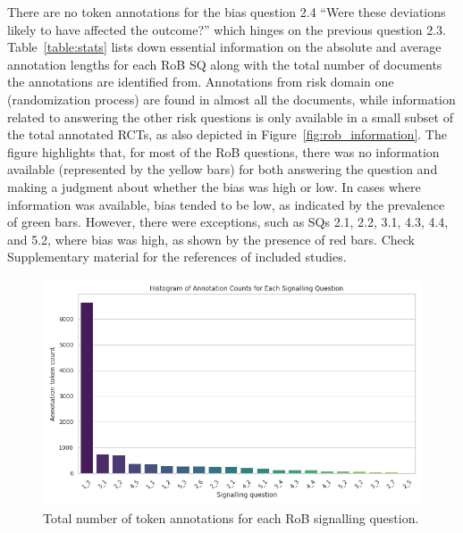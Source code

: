 \documentclass[sn-mathphys,Numbered]{sn-jnl}%
\theoremstyle{thmstyleone}%
\theoremstyle{thmstyletwo}%
\theoremstyle{thmstylethree}%
\begin{document}
 
There are no token annotations for the bias question 2.4 ``Were these deviations likely to have affected the outcome?'' which hinges on the previous question 2.3.
Table~\ref{table:stats} lists down essential information on the absolute and average annotation lengths for each RoB SQ along with the total number of documents the annotations are identified from.
Annotations from risk domain one (randomization process) are found in almost all the documents, while information related to answering the other risk questions is only available in a small subset of the total annotated RCTs, as also depicted in Figure~\ref{fig:rob_information}.
The figure highlights that, for most of the RoB questions, there was no information available (represented by the yellow bars) for both answering the question and making a judgment about whether the bias was high or low.
In cases where information was available, bias tended to be low, as indicated by the prevalence of green bars. 
However, there were exceptions, such as SQs 2.1, 2.2, 3.1, 4.3, 4.4, and 5.2, where bias was high, as shown by the presence of red bars.
Check Supplementary material for the references of included studies. %
%
%
%
\begin{figure}[htb]
    \centering
    \includegraphics[width=0.60\columnwidth]{figures/sq_ann_raw_counts.png}
    \caption{Total number of token annotations for each RoB signalling question.}
    \label{fig:ann_counts}
\end{figure}
%
%
%
\end{document}
